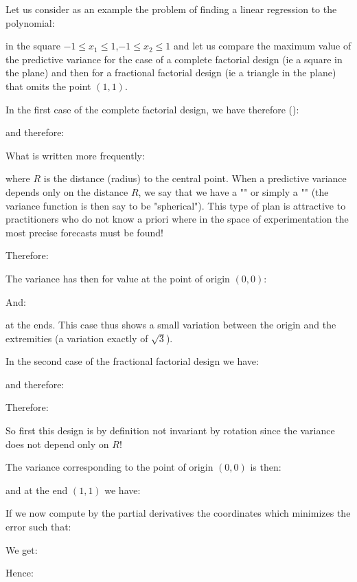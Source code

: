 	Let us consider as an example the problem of finding a linear regression to the polynomial:
	
	in the square $-1\leq x_1 \leq 1$,$-1\leq x_2\leq 1$ and let us compare the maximum value of the predictive variance for the case of a complete factorial design (ie a square in the plane) and then for a fractional factorial design (ie a triangle in the plane) that omits the point $(1,1)$.
	
	In the first case of the complete factorial design, we have therefore ():
	
	and therefore:
	
	What is written more frequently:
	
	where $R$ is the distance (radius) to the central point. When a predictive variance depends only on the distance $R$, we say that we have a "" or simply a "" (the variance function is then say to be "spherical"). This type of plan is attractive to practitioners who do not know a priori where in the space of experimentation the most precise forecasts must be found!

	Therefore:
	
	The variance has then for value at the point of origin $(0,0)$:
	
	And:
	
 	at the ends. This case thus shows a small variation between the origin and the extremities (a variation exactly of $\sqrt{3}$).

	In the second case of the fractional factorial design we have:
	
	and therefore:
	
	Therefore:
	
	So first this design is by definition not invariant by rotation since the variance does not depend only on $R$!

	The variance corresponding to the point of origin $(0,0)$ is then:
	
 	and at the end $(1,1)$ we have:
	
 	If we now compute by the partial derivatives the coordinates which minimizes the error such that:
	
 	We get:
	
 	Hence:
	
